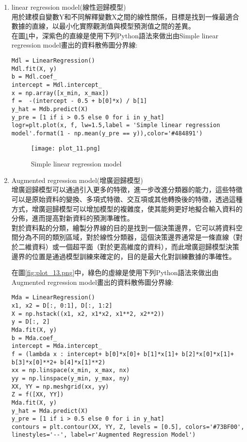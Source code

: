 \documentclass[12pt, a4paper]{article}
\begin{document}
\begin{enumerate}
\item linear regression model\;(線性迴歸模型)\\
用於建模自變數\;Y\;和不同解釋變數\;X\;之間的線性關係，目標是找到一條最適合數據的直線，以最小化實際觀測值與模型預測值之間的差異。\\
在圖\;\ref{fig:plot_12.png}\;中，深紫色的直線是使用下列Python語法來做出由Simple linear regression model畫出的資料散佈圖分界線\;:
\begin{lstlisting}
Mdl = LinearRegression()
Mdl.fit(X, y) 
b = Mdl.coef_
intercept = Mdl.intercept_
x = np.array([x_min, x_max])
f =  -(intercept - 0.5 + b[0]*x) / b[1]
y_hat = Mdb.predict(X) 
y_pre = [1 if i > 0.5 else 0 for i in y_hat]
logr=plt.plot(x, f, lw=1.5,label = 'Simple linear regression model'.format(1 - np.mean(y_pre == y)),color='#484891')
\end{lstlisting}

\begin{figure}[h]
\centering
\texttt{[image: plot\_11.png]}
\caption{Simple linear regression model}
\label{fig:plot_12.png}
\end{figure}

\item Augmented regression model\;(增廣迴歸模型)\\
增廣迴歸模型可以通過引入更多的特徵，進一步改進分類器的能力，這些特徵可以是原始資料的變換、多項式特徵、交互項或其他轉換後的特徵，透過這種方式，增廣迴歸模型可以增加模型的複雜度，使其能夠更好地擬合輸入資料的分佈，進而提高對新資料的預測準確性。\\
對於資料點的分類，繪製分界線的目的是找到一個決策邊界，它可以將資料空間分為不同的類別區域，對於線性分類器，這個決策邊界通常是一條直線（對於二維資料）或一個超平面（對於更高維度的資料），而此增廣迴歸模型決策邊界的位置是通過模型訓練來確定的，目的是最大化對訓練數據的準確性。


在圖\;\ref{fig:plot_13.png}\;中，綠色的虛線是使用下列Python語法來做出由Augmented regression model畫出的資料散佈圖分界線\;:
\begin{lstlisting}
Mda = LinearRegression()
x1, x2 = D[:, 0:1], D[:, 1:2]
X = np.hstack((x1, x2, x1*x2, x1**2, x2**2))
y = D[:, 2]
Mda.fit(X, y)
b = Mda.coef_
intercept = Mda.intercept_
f = (lambda x : intercept+ b[0]*x[0]+ b[1]*x[1]+ b[2]*x[0]*x[1]+ b[3]*x[0]**2+ b[4]*x[1]**2)
xx = np.linspace(x_min, x_max, nx)
yy = np.linspace(y_min, y_max, ny)
XX, YY = np.meshgrid(xx, yy)
Z = f([XX, YY])
Mda.fit(X, y)
y_hat = Mda.predict(X)
y_pre = [1 if i > 0.5 else 0 for i in y_hat]
contours = plt.contour(XX, YY, Z, levels = [0.5], colors='#73BF00', linestyles='--', label=r'Augmented Regression Model')
\end{lstlisting}


\end{enumerate}
\end{document}
